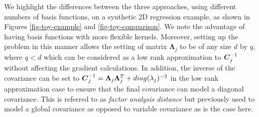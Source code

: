 \documentclass[useAMS,usenatbib,fleqn]{mn2e}
\begin{document}
We highlight the differences between the three approaches, using different numbers of basis functions, on a synthetic 2D regression example, as shown in Figures \ref{fig-toy-example} and \ref{fig-toy-comparison}. We note the advantage of having basis functions with more flexible kernels. Moreover, setting up the problem in this manner allows the setting of matrix $\mathbf\Lambda_{j}$ to be of any size $d$ by $q$, where $q<d$ which can be considered as a low rank approximation to $\bmath{C}_{j}^{-1}$ without affecting the gradient calculations. In addition, the inverse of the covariance can be set to  $\bmath{C}_{j}^{-1}=\mathbf\Lambda_{j}\mathbf\Lambda_{j}^{T}+diag(\lambda_{j})^{-2}$ in the low rank approximation case to ensure that the final covariance can model a diagonal covariance. This is referred to as \emph{factor analysis distance} \citep[p. 107]{rasmussen2006gaussian} but previously used to model a global covariance as opposed to variable covariance as is the case here.
\end{document}

